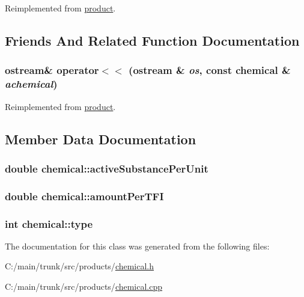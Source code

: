 Reimplemented from \hyperlink{classproduct_a1151ea416ab90047f8d087be57a6d7b1}{product}.

\subsection{Friends And Related Function Documentation}
\hypertarget{classchemical_aa56b071bc2d38852ba56f7b6c9e10b81}{
\subsubsection[{operator$<$$<$}]{\setlength{\rightskip}{0pt plus 5cm}ostream\& operator$<$$<$ (ostream \& {\em os}, \/  const {\bf chemical} \& {\em achemical})}}
\label{classchemical_aa56b071bc2d38852ba56f7b6c9e10b81}


Reimplemented from \hyperlink{classproduct_a1b6bf2f2c82a18a17907ee1192fd94bb}{product}.

\subsection{Member Data Documentation}
\hypertarget{classchemical_ade159c0dbe449923483c0f6c764d2a92}{
\subsubsection[{activeSubstancePerUnit}]{\setlength{\rightskip}{0pt plus 5cm}double {\bf chemical::activeSubstancePerUnit}}}
\label{classchemical_ade159c0dbe449923483c0f6c764d2a92}
\hypertarget{classchemical_a6bbe39833c0a3e01b8db20353213ebfd}{
\subsubsection[{amountPerTFI}]{\setlength{\rightskip}{0pt plus 5cm}double {\bf chemical::amountPerTFI}}}
\label{classchemical_a6bbe39833c0a3e01b8db20353213ebfd}
\hypertarget{classchemical_a01dc27d1131089e1bd40e712f2db707c}{
\subsubsection[{type}]{\setlength{\rightskip}{0pt plus 5cm}int {\bf chemical::type}}}
\label{classchemical_a01dc27d1131089e1bd40e712f2db707c}


The documentation for this class was generated from the following files:\begin{DoxyCompactItemize}
\item 
C:/main/trunk/src/products/\hyperlink{chemical_8h}{chemical.h}\item 
C:/main/trunk/src/products/\hyperlink{chemical_8cpp}{chemical.cpp}\end{DoxyCompactItemize}
